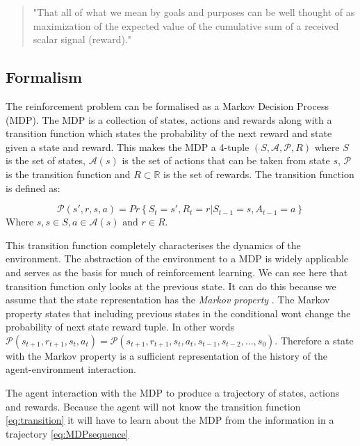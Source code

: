 \begin{quote}
    "That all of what we mean by goals and purposes can be well thought of as maximization of the expected value of the cumulative sum of a received scalar signal (reward)." 
    \cite{suttonReinforcementLearningSecond2018}
    \label{quote:reward}
\end{quote}

\subsection{Formalism}

The reinforcement problem can be formalised as a Markov Decision Process (MDP). The MDP is a collection of states, actions and rewards along with a transition function which states the probability of the next reward and state given a state and reward. This makes the MDP a 4-tuple $(S,\mathcal{A}, \mathcal{P}, R)$ where $S$ is the set of states, $\mathcal{A}(s)$ is the set of actions that can be taken from state $s$, $\mathcal{P}$ is the transition function and $R \subset \mathbb{R}$ is the set of rewards. The transition function is defined as:

\begin{equation}
\mathcal{P}(s',r, s,a) = Pr\left\{ S_{t}=s', R_{t}=r | S_{t-1}=s, A_{t-1}=a \right\}
\label{eq:transition}
\end{equation}
Where $s,s \in S, a \in \mathcal{A}(s) \text{ and } r \in R$.

This transition function completely characterises the dynamics of the environment. The abstraction of the environment to a MDP is widely applicable and serves as the basis for much of reinforcement learning. We can see here that transition function only looks at the previous state. It can do this because we assume that the state representation has the \textit{Markov property} \cite{suttonReinforcementLearningSecond2018}. The Markov property states that including previous states in the conditional wont change the probability of next state reward tuple. In other words $\mathcal{P}(s_{t+1}, r_{t+1}, s_{t},a_{t}) = \mathcal{P}(s_{t+1}, r_{t+1}, s_{t},a_{t}, s_{t-1}, s_{t-2}, ... , s_{0})$. Therefore a state with the Markov property is a sufficient representation of the history of the agent-environment interaction. 

The agent interaction with the MDP to produce a trajectory of states, actions and rewards. Because the agent will not know the transition function \ref{eq:transition} it will have to learn about the MDP from the information in a trajectory \ref{eq:MDPsequence}

